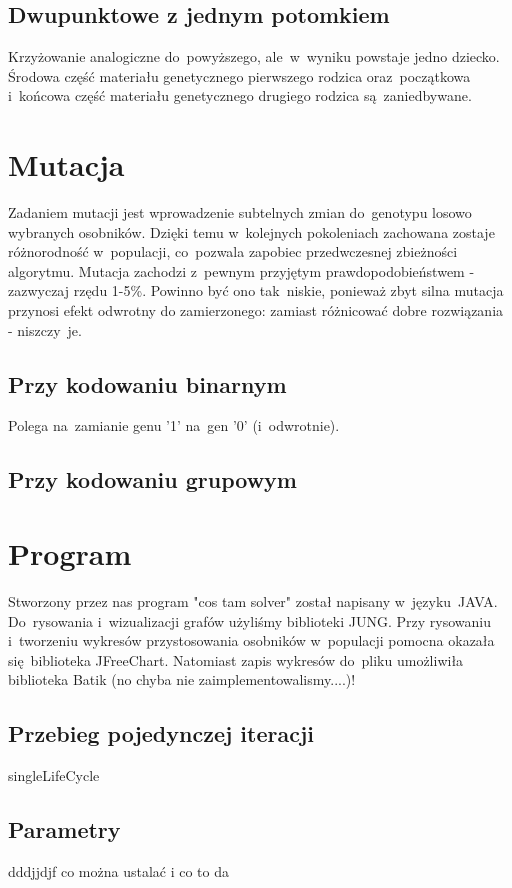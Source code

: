 \documentclass[11pt]{aghdpl}
\begin{document}
\section{Dwupunktowe z jednym potomkiem}
\label{sec:dwaJeden}
Krzyżowanie analogiczne do~powyższego, ale~w~wyniku powstaje jedno dziecko. Środowa część materiału genetycznego pierwszego 
rodzica oraz~początkowa i~końcowa część materiału genetycznego drugiego rodzica są~zaniedbywane.

\chapter{Mutacja}
\label{cha:mutation}
Zadaniem mutacji jest wprowadzenie subtelnych zmian do~genotypu losowo wybranych osobników. Dzięki temu w~kolejnych pokoleniach 
zachowana zostaje różnorodność w~populacji, co~pozwala zapobiec przedwczesnej zbieżności algorytmu. Mutacja zachodzi z~pewnym przyjętym prawdopodobieństwem - zazwyczaj rzędu 1-5\%. Powinno być ono tak~niskie, ponieważ zbyt silna mutacja przynosi 
efekt odwrotny do zamierzonego: zamiast różnicować dobre rozwiązania - niszczy~je.

\section{Przy kodowaniu binarnym}
\label{sec:kodBin}
Polega na~zamianie genu '1' na~gen '0' (i~odwrotnie).
\section{Przy kodowaniu grupowym}
\label{sec:kodGru}

\chapter{Program}
\label{cha:program}
Stworzony przez nas program "cos tam solver" został napisany w~języku~JAVA. Do~rysowania i~wizualizacji grafów użyliśmy biblioteki 
JUNG. Przy rysowaniu i~tworzeniu wykresów przystosowania osobników w~populacji pomocna okazała się~biblioteka JFreeChart. Natomiast 
zapis wykresów do~pliku umożliwiła biblioteka Batik (no chyba nie zaimplementowalismy....)!
\section{Przebieg pojedynczej iteracji}
\label{sec:singleLifeCycle}
singleLifeCycle
\section{Parametry}
\label{sec:params}
dddjjdjf
co można ustalać i co to da
\end{document}
